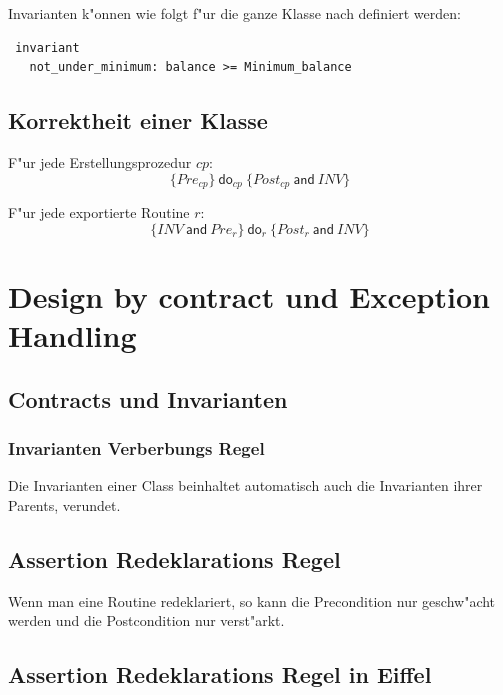 \documentclass[german, 10pt, a4paper, twocolumn]{scrartcl}
\theoremstyle{definition}
\begin{document}
Invarianten k"onnen wie folgt f"ur die ganze Klasse nach \verb@feature@ definiert werden:

\begin{verbatim}
 invariant
   not_under_minimum: balance >= Minimum_balance
\end{verbatim}

\subsection{Korrektheit einer Klasse}

F"ur jede Erstellungsprozedur $cp$:
\begin{displaymath}
	\{Pre_{cp}\} \: \textsf{do}_{cp} \: \{ Post_{cp} \: \textsf{and} \: INV \}
\end{displaymath}

F"ur jede exportierte Routine $r$:
\begin{displaymath}
	\{INV \: \textsf{and} \: Pre_{r}\} \: \textsf{do}_{r} \: \{ Post_{r} \: \textsf{and} \: INV \}
\end{displaymath}

\section{Design by contract und Exception Handling}

\subsection{Contracts und Invarianten}

\subsubsection{Invarianten Verberbungs Regel}

Die Invarianten einer Class beinhaltet automatisch auch die Invarianten ihrer Parents, verundet.

\subsection{Assertion Redeklarations Regel}

Wenn man eine Routine redeklariert, so kann die Precondition nur geschw"acht werden und die Postcondition nur verst"arkt.

\subsection{Assertion Redeklarations Regel in Eiffel}
\end{document}
